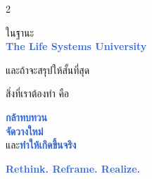 \documentclass[10pt]{article}
\begin{document}
\begin{tcolorbox}[breakable,colback=panel,colframe=line,boxrule=0.5pt,arc=2mm,left=3mm,right=3mm,top=2mm,bottom=2mm]
\begin{multicols}{2}
\par ในฐานะ\\ \textbf{\textcolor{highlight}{The Life Systems University}}
\par และถ้าจะสรุปให้สั้นที่สุด
\par สิ่งที่เราต้องทำ คือ
\par \textbf{\textcolor{highlight}{กล้าทบทวน}}\\ \textbf{\textcolor{highlight}{จัดวางใหม่}}\\ และ\textbf{\textcolor{highlight}{ทำให้เกิดขึ้นจริง}}
\par \textbf{\textcolor{highlight}{Rethink. Reframe. Realize.}}
\end{multicols}
\end{tcolorbox}
\end{document}
